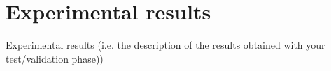 \section{Experimental results}
Experimental results (i.e. the description of the results obtained with your
test/validation phase))